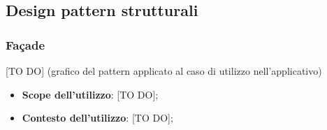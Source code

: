 %


\subsection{Design pattern strutturali} %
\label{sub:design_pattern_strutturali}
	\subsubsection{Fa\c{c}ade} %
	\label{ssub:facade}
	[TO DO] (grafico del pattern applicato al caso di utilizzo nell'applicativo)
		\begin{itemize}
			\item \textbf{Scope dell'utilizzo}: [TO DO];
			\item \textbf{Contesto dell'utilizzo}: [TO DO];
		\end{itemize}



